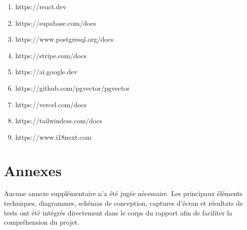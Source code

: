 \documentclass[12pt, a4paper]{report}
\begin{document}
\begin{enumerate}

\item https://react.dev

\item https://supabase.com/docs

\item https://www.postgresql.org/docs

\item https://stripe.com/docs

\item https://ai.google.dev

\item https://github.com/pgvector/pgvector

\item https://vercel.com/docs

\item https://tailwindcss.com/docs

\item https://www.i18next.com

\end{enumerate}
\chapter*{Annexes}
Aucune annexe supplémentaire n'a été jugée nécessaire. Les principaux éléments techniques, diagrammes, schémas de conception, captures d'écran et résultats de tests ont été intégrés directement dans le corps du rapport afin de faciliter la compréhension du projet.
\end{document}
